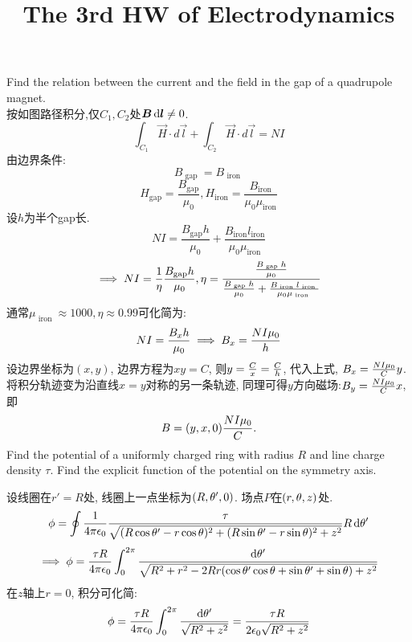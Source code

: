 \documentclass[UTF8,9pt]{ctexart}
\title{The 3rd HW of Electrodynamics}
\begin{document}
 
\maketitle
{}
Find the relation between the current and the field in the gap of a quadrupole magnet.\\
按如图路径积分,仅$C_1,C_2$处$\bm{B}\mathop{}\!\mathrm{d} \bm{l} \neq 0$.
$$\int_{C_1} \vec{H} \cdot d \vec{l}+\int_{C_2} \vec{H} \cdot d \vec{l}=N I$$
由边界条件:
$$ 
B_{\text { gap }}=B_{\text { iron }}
 $$
 $$ 
 H_{\mathrm{gap}}=\frac{B_{\mathrm{gap}}}{\mu_{0}}, H_{\mathrm{iron}}=\frac{B_{\mathrm{iron}}}{\mu_{0} \mu_{\mathrm{iron}}}
  $$
设$h$为半个gap长.
$$ 
N I=\frac{B_{\mathrm{gap}} h}{\mu_{0}} +\frac{B_{\mathrm{iron}} l_{\mathrm{iron}}}{\mu_{0} \mu_{\mathrm{iron}}}
 $$
 $$ 
 \implies N I=\frac{1}{\eta} \frac{B_{\mathrm{gap}} h}{\mu_{0}} , \eta=\frac{\frac{B_{\text { gap }} h}{\mu_{0}} }{\frac{B_{\text { gap }} h}{\mu_{0}} +\frac{B_{\text { iron }} l_{\text { iron }}}{\mu_{0} \mu_{\text { iron }}}}
$$
通常$ \mu_{\text { iron }} \approx 1000,\eta \approx 0.99$可化简为:
$$N I=\frac{B_x h}{\mu_{0}} \implies B_x=\frac{NI\mu_0}{h}$$
设边界坐标为$(x,y)$, 边界方程为$xy=C$, 则$y=\frac{C}{x}=\frac{C}{h}$, 代入上式, $B_x=\frac{NI\mu_0}{C}y$. 将积分轨迹变为沿直线$x=y$对称的另一条轨迹, 同理可得$y$方向磁场:$B_y=\frac{NI\mu_0}{C}x$, 即
$$B=(y,x,0)\frac{NI\mu_0}{C}.$$
Find the potential of a uniformly charged ring with radius $R$ and line charge density $\tau$. Find the explicit function of the potential on the symmetry axis.

设线圈在$r'=R$处, 线圈上一点坐标为$(R,\theta',0)$. 场点$P$在$(r,\theta,z)$处. 
$$\phi = \oint \frac{1}{4\pi\epsilon_0}\frac{\tau}{\sqrt{(R\cos\theta'-r\cos\theta)^2+(R\sin\theta'-r\sin\theta)^2+z^2}}R\mathop{}\!\mathrm{d} \theta'$$
$$\implies \phi = \frac{\tau R}{4\pi\epsilon_0}\int_0^{2\pi}\frac{\mathop{}\!\mathrm{d}\theta'}{\sqrt{R^2+r^2-2Rr(\cos\theta'\cos\theta+\sin\theta'+\sin\theta)+z^2}}$$
在$z$轴上$r=0$, 积分可化简: 
$$\phi = \frac{\tau R}{4\pi\epsilon_0}\int_0^{2\pi}\frac{\mathop{}\!\mathrm{d}\theta'}{\sqrt{R^2+z^2}}=\frac{\tau R}{2\epsilon_0 \sqrt{R^2+z^2} }$$
\end{document}
